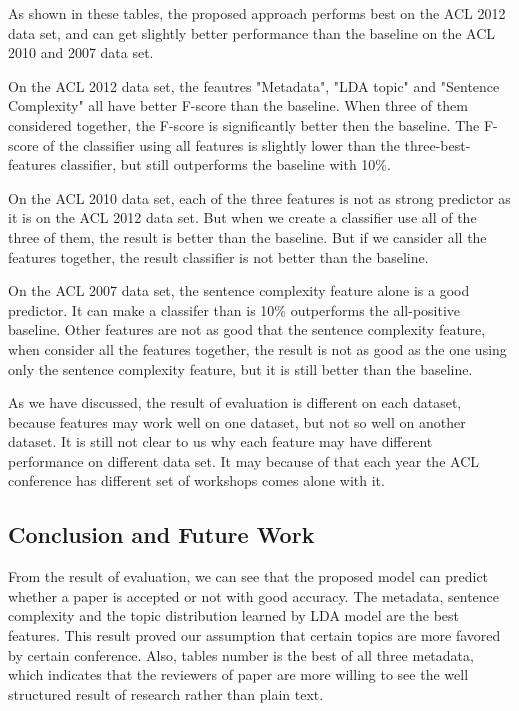 \documentclass[11pt,letterpaper]{article}
\begin{document}
As shown in these tables,
the proposed approach performs best on the ACL 2012 data set,
and can get slightly better performance than the baseline on the ACL 2010 and 2007 data set.

On the ACL 2012 data set, the feautres "Metadata", "LDA topic" and "Sentence Complexity" 
all have better F-score than the baseline.
When three of them considered together, the F-score is significantly better then the baseline.
The F-score of the classifier using all features is slightly lower than the three-best-features classifier,
but still outperforms the baseline with 10\%.

On the ACL 2010 data set, each of the three features is not as strong predictor as it is on the ACL 2012 data set.
But when we create a classifier use all of the three of them, 
the result is better than the baseline. 
But if we cansider all the features together, 
the result classifier is not better than the baseline.

On the ACL 2007 data set, the sentence complexity feature alone is a good predictor.
It can make a classifer than is 10\% outperforms the all-positive baseline.
Other features are not as good that the sentence complexity feature,
when consider all the features together, the result is not as good as the one using only the sentence complexity feature,
but it is still better than the baseline.

As we have discussed, the result of evaluation is different on each dataset, because features may work well on one dataset, 
but not so well on another dataset.
It is still not clear to us why each feature may have different performance on different data set.
It may because of that each year the ACL conference has different set of workshops comes alone with it.


\subsection{Conclusion and Future Work} 
From the result of evaluation, we can see that the proposed model can predict whether a paper is accepted or not with good accuracy. 
The metadata, sentence complexity and the topic distribution learned by LDA model are the best features.
This result proved our assumption that certain topics are more favored by certain conference. 
Also, tables number is the best of all three metadata, which indicates that the reviewers of paper are more willing to see the well structured result of research rather than plain text.
\end{document}

